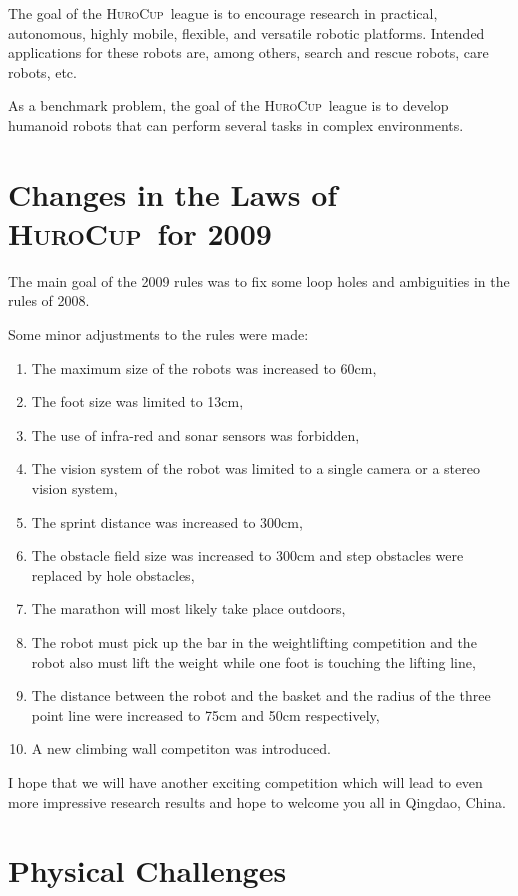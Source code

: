 \documentclass[12pt]{article}
\newcommand{\HuroCup}{\textsc{HuroCup}}
\begin{document}
The goal of the \HuroCup\ league is to encourage research in
practical, autonomous, highly mobile, flexible, and versatile robotic
platforms. Intended applications for these robots are, among others,
search and rescue robots, care robots, etc.

As a benchmark problem, the goal of the \HuroCup\ league is to develop
humanoid robots that can perform several tasks in complex environments.

\section{Changes in the Laws of \HuroCup\ for 2009}

The main goal of the 2009 rules was to fix some loop holes and
ambiguities in the rules of 2008. 

Some minor adjustments to the rules were made:
\begin{enumerate}
\item The maximum size of the robots was increased to 60cm,
\item The foot size was limited to 13cm,
\item The use of infra-red and sonar sensors was forbidden,
\item The vision system of the robot was limited to a single camera or a stereo vision system,
\item The sprint distance was increased to 300cm,
\item The obstacle field size was increased to 300cm and step obstacles were replaced by hole obstacles,
\item The marathon will most likely take place outdoors,
\item The robot must pick up the bar in the weightlifting competition and the robot also must lift the weight while one foot is touching the lifting line,
\item The distance between the robot and the basket and the radius of the three point line were increased to 75cm and 50cm respectively,
\item A new climbing wall competiton was introduced.

\end{enumerate}

I hope that we will have another exciting competition which will lead
to even more impressive research results and hope to welcome you all
in Qingdao, China.

\section{Physical Challenges}    
\label{sec:physical-challenges}
\end{document}
